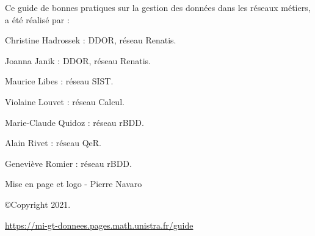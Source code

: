 \vspace*{\fill}
\begingroup

Ce guide de bonnes pratiques sur la gestion des données dans les réseaux métiers, a été réalisé par  :

\begin{list}{-}{}
\item Christine Hadrossek : DDOR, réseau Renatis.
\item Joanna Janik : DDOR, réseau Renatis.
\item Maurice Libes : réseau SIST.
\item Violaine Louvet : réseau Calcul.
\item Marie-Claude Quidoz : réseau rBDD.
\item Alain Rivet : réseau QeR.
\item Geneviève Romier : réseau rBDD.
\end{list}

Mise en page et logo - Pierre Navaro

\copyright Copyright 2021.

\url{https://mi-gt-donnees.pages.math.unistra.fr/guide}

\endgroup

\vspace*{\fill}
\clearpage
